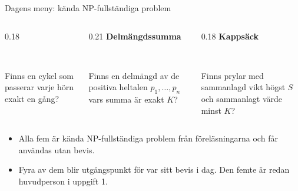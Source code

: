 \documentclass[aspectratio=169,10pt]{beamer}
\begin{document}
\begin{frame}{Dagens meny: kända NP-fullständiga problem}
\begin{columns}[T]
\begin{column}{0.18\textwidth}
\\[1mm]
      {\scriptsize Finns en cykel som passerar varje hörn exakt en gång?\par}
    \end{column}
    \begin{column}{0.21\textwidth}
      \centering\textbf{\small Delmängdssumma}\\[1mm]
      \\[1mm]
      {\scriptsize Finns en delmängd av de positiva heltalen $p_1,\dots,p_n$ vars summa är exakt $K$?\par}
    \end{column}
    \begin{column}{0.18\textwidth}
      \centering\textbf{\small Kappsäck}\\[1mm]
      \\[1mm]
      {\scriptsize Finns prylar med sammanlagd vikt högst $S$ och sammanlagt värde minst $K$?\par}
    \end{column}
  \end{columns}
  \vspace{4mm}
  \begin{itemize}
    \item<2-> Alla fem är kända NP-fullständiga problem från föreläsningarna och får användas utan bevis.
    \item<3-> Fyra av dem blir utgångspunkt för var sitt bevis i dag. Den femte är redan huvudperson i uppgift 1.
  \end{itemize}
\end{frame}
\end{document}
